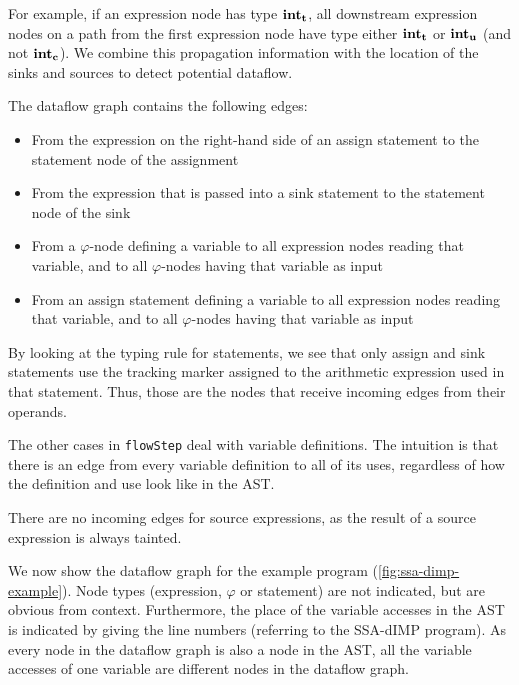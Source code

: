 For example, if an expression node has type $\textbf{int}_\textbf{t}$,
all downstream expression nodes on a path from the first expression node 
have type either $\textbf{int}_\textbf{t}$ or $\textbf{int}_\textbf{u}$ (and not $\textbf{int}_\textbf{c}$).
We combine this propagation information with the location of the sinks and sources 
to detect potential dataflow.

The dataflow graph contains the following edges:
\begin{itemize}
    \item From the expression on the right-hand side of an assign statement 
    to the statement node of the assignment
    \item From the expression that is passed into a sink statement to the statement node
    of the sink
    \item From a $\varphi$-node defining a variable to all expression nodes reading 
    that variable, and to all $\varphi$-nodes having that variable as input
    \item From an assign statement defining a variable to all expression nodes reading 
    that variable, and to all $\varphi$-nodes having that variable as input
\end{itemize}

By looking at the typing rule for statements, we see that only assign and sink statements
use the tracking marker assigned to the arithmetic expression used in that statement.
Thus, those are the nodes that receive incoming edges from their operands.

The other cases in \texttt{flowStep} deal with variable definitions.
The intuition is that there is an edge from every variable definition to all of its uses,
regardless of how the definition and use look like in the AST.

There are no incoming edges for source expressions, as the result of a source expression
is always tainted.

We now show the dataflow graph for the example program (\autoref{fig:ssa-dimp-example}).
Node types (expression, $\varphi$ or statement) are not indicated, but are obvious from context.
Furthermore, the place of the variable accesses in the AST is indicated by giving the 
line numbers (referring to the SSA-dIMP program).
As every node in the dataflow graph is also a node in the AST, all the variable accesses
of one variable are different nodes in the dataflow graph.

